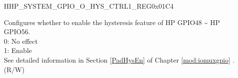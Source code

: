 \begin{register}{H}{HP\_SYSTEM\_GPIO\_O\_HYS\_CTRL1\_REG}{0x01C4}\label{regdesc:HPSYSTEMGPIOOHYSCTRL1REG}
%
%
\regnewline%
\begin{regdesc}\begin{reglist}
\label{fielddesc:HPSYSTEMGPIO0HYSHIGH}\item [HP\_SYSTEM\_GPIO\_0\_HYS\_HIGH] Configures whether to enable the hysteresis feature of HP GPIO48 \textasciitilde{} HP GPIO56. \\
0: No effect\\
1: Enable\\
See detailed information in Section \ref{PadHysEn} of Chapter \ref{mod:iomuxgpio} \textit{}.\\
(R/W)
\end{reglist}\end{regdesc}
\end{register}


